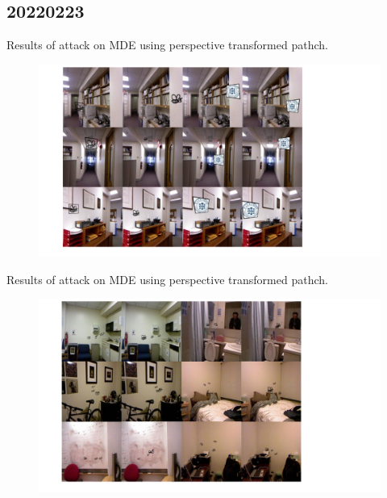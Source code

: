 \documentclass[10pt]{beamer}
\begin{document}
\subsection{20220223}
\begin{frame}
  Results of attack on MDE using perspective transformed pathch.
  \begin{figure}
    \includegraphics[width=1\linewidth]{figure/20220223/AttackMDE_01.pdf}
  \end{figure}
\end{frame}
\begin{frame}
  Results of attack on MDE using perspective transformed pathch.
  \begin{figure}
    \includegraphics[width=1\linewidth]{figure/20220223/AttackMDE_02.pdf}
  \end{figure}
\end{frame}
\end{document}
